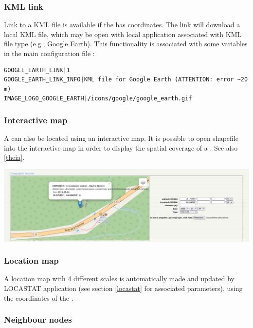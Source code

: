 \subsubsection{KML link}

Link to a KML file is available if the  has coordinates. The link will download a local KML file, which may be open with local application associated with KML file type (e.g., Google Earth). This functionality is associated with some variables in the main configuration file :

\begin{lstlisting}[title=\wofile{WEBOBS.rc} (excerpt)]
GOOGLE_EARTH_LINK|1
GOOGLE_EARTH_LINK_INFO|KML file for Google Earth (ATTENTION: error ~20 m)
IMAGE_LOGO_GOOGLE_EARTH|/icons/google/google_earth.gif
\end{lstlisting}

\subsubsection{Interactive map}

A  can also be located using an interactive map. It is possible to open shapefile into the interactive map in order to display the spatial coverage of a . See also \ref{theia}.

\includegraphics[width=\textwidth]{figures/interactive_map.png}

\subsubsection{Location map}

A location map with 4 different scales is automatically made and updated by LOCASTAT application (see section \ref{locastat} for associated parameters), using the coordinates of the .


\subsubsection{Neighbour nodes}

